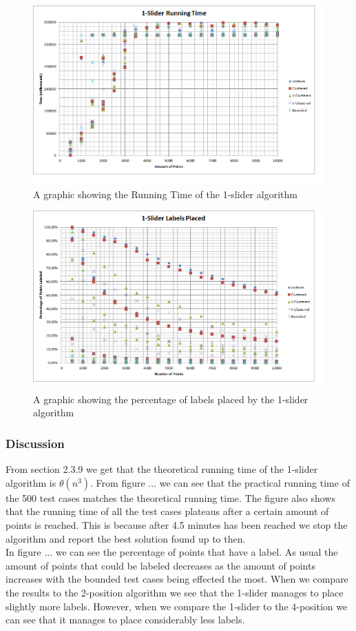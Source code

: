 \documentclass[crop=false,a4paper,oneside,11pt]{standalone}
\begin{document}
 \begin{figure}[H]
 \centering
 \centerline{\includegraphics[scale = 0.65]{1slider.png}}
 \caption{A graphic showing the Running Time of the 1-slider algorithm}
 \end{figure}

 \begin{figure}[H]
 \centering
  \centerline{\includegraphics[scale = 0.65]{1sliderplaced.png}}
  \caption{A graphic showing the percentage of labels placed by the 1-slider algorithm}
 \end{figure}

\subsubsection{Discussion}
From section 2.3.9 we get that the theoretical running time of the 1-slider algorithm is $\theta(n^3)$. From figure ... we can see that the practical running time of the 500 test cases matches the theoretical running time. The figure also shows that the running time of all the test cases plateaus after a certain amount of points is reached. This is because after 4.5 minutes has been reached we stop the algorithm and report the best solution found up to then.\\
In figure ... we can see the percentage of points that have a label. As usual the amount of points that could be labeled decreases as the amount of points increases with the bounded test cases being effected the most. When we compare the results to the 2-position algorithm we see that the 1-slider manages to place slightly more labels. However, when we compare the 1-slider to the 4-position we can see that it manages to place considerably less labels.
\end{document}
